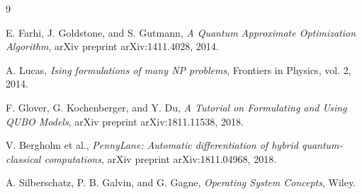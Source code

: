\documentclass[12pt,a4paper,oneside]{report}
\begin{document}
\begin{thebibliography}{9}

E. Farhi, J. Goldstone, and S. Gutmann,
\textit{A Quantum Approximate Optimization Algorithm},
arXiv preprint arXiv:1411.4028, 2014.

A. Lucas,
\textit{Ising formulations of many NP problems},
Frontiers in Physics, vol. 2, 2014.

F. Glover, G. Kochenberger, and Y. Du,
\textit{A Tutorial on Formulating and Using QUBO Models},
arXiv preprint arXiv:1811.11538, 2018.

V. Bergholm et al.,
\textit{PennyLane: Automatic differentiation of hybrid quantum-classical computations},
arXiv preprint arXiv:1811.04968, 2018.

A. Silberschatz, P. B. Galvin, and G. Gagne,
\textit{Operating System Concepts},
Wiley.

\end{thebibliography}
\end{document}
